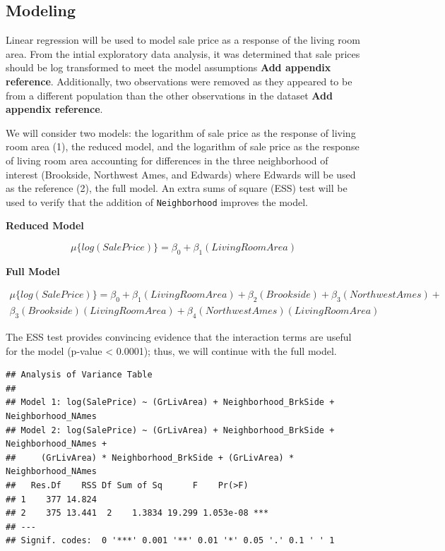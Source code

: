 \documentclass[american,]{article}
\begin{document}
\hypertarget{modeling}{%
\subsection{Modeling}\label{modeling}}

Linear regression will be used to model sale price as a response of the
living room area. From the intial exploratory data analysis, it was
determined that sale prices should be log transformed to meet the model
assumptions \textbf{Add appendix reference}. Additionally, two
observations were removed as they appeared to be from a different
population than the other observations in the dataset \textbf{Add
appendix reference}.

We will consider two models: the logarithm of sale price as the response
of living room area (1), the reduced model, and the logarithm of sale
price as the response of living room area accounting for differences in
the three neighborhood of interest (Brookside, Northwest Ames, and
Edwards) where Edwards will be used as the reference (2), the full
model. An extra sums of square (ESS) test will be used to verify that
the addition of \texttt{Neighborhood} improves the model.

\textbf{Reduced Model}

\begin{equation}
\mu \lbrace log(SalePrice) \rbrace = \beta_0 + \beta_1(LivingRoomArea) \label{eq:reduced}
\end{equation}

\textbf{Full Model}

\begin{align}
\mu \lbrace log(SalePrice) \rbrace = \beta_0 + \beta_1(LivingRoomArea) +  \beta_2(Brookside) +\beta_3(NorthwestAmes) + \nonumber\\
\beta_3(Brookside)(LivingRoomArea) + \beta_4(NorthwestAmes)(LivingRoomArea) \label{eq:full}
\end{align}

The ESS test provides convincing evidence that the interaction terms are
useful for the model (p-value \textless{} 0.0001); thus, we will
continue with the full model.

\begin{verbatim}
## Analysis of Variance Table
## 
## Model 1: log(SalePrice) ~ (GrLivArea) + Neighborhood_BrkSide + Neighborhood_NAmes
## Model 2: log(SalePrice) ~ (GrLivArea) + Neighborhood_BrkSide + Neighborhood_NAmes + 
##     (GrLivArea) * Neighborhood_BrkSide + (GrLivArea) * Neighborhood_NAmes
##   Res.Df    RSS Df Sum of Sq      F    Pr(>F)    
## 1    377 14.824                                  
## 2    375 13.441  2    1.3834 19.299 1.053e-08 ***
## ---
## Signif. codes:  0 '***' 0.001 '**' 0.01 '*' 0.05 '.' 0.1 ' ' 1
\end{verbatim}
\end{document}
